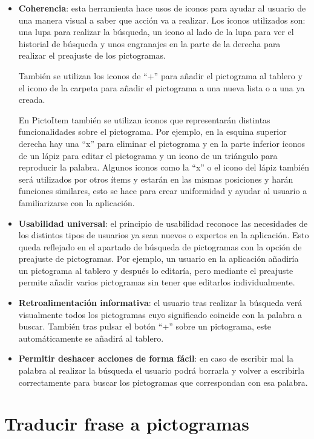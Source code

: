 \begin{itemize}
	\item \textbf{Coherencia}: esta herramienta hace usos de iconos para ayudar al usuario de una manera visual a saber que acción va a realizar. Los iconos utilizados son: una lupa para realizar la búsqueda, un icono al lado de la lupa para ver el historial de búsqueda y unos engranajes en la parte de la derecha para realizar el preajuste de los pictogramas.
	
	También se utilizan los iconos de “+” para añadir el pictograma al tablero y el icono de la carpeta para añadir el pictograma a una nueva lista o a una ya creada.
	
	En PictoItem también se utilizan iconos que representarán distintas funcionalidades sobre el pictograma. Por ejemplo, en la esquina superior derecha hay una “x” para eliminar el pictograma y en la parte inferior iconos de un lápiz para editar el pictograma y un icono de un triángulo para reproducir la palabra. Algunos iconos como la “x” o el icono del lápiz también será utilizados por otros ítems y estarán en las mismas posiciones y harán funciones similares, esto se hace para crear uniformidad y ayudar al usuario a familiarizarse con la aplicación.
	
	
	\item \textbf{Usabilidad universal}: el principio de usabilidad reconoce las necesidades de los distintos tipos de usuarios ya sean nuevos o expertos en la aplicación. Esto queda reflejado en el apartado de búsqueda de pictogramas con la opción de preajuste de pictogramas. Por ejemplo, un usuario en la aplicación añadiría un pictograma al tablero y después lo editaría, pero mediante el preajuste permite añadir varios pictogramas sin tener que editarlos individualmente.
	
	\item \textbf{Retroalimentación informativa}: el usuario tras realizar la búsqueda verá visualmente todos los pictogramas cuyo significado coincide con la palabra a buscar. También tras pulsar el botón “+” sobre un pictograma, este automáticamente se añadirá al tablero.
	
	
	\item \textbf{Permitir deshacer acciones de forma fácil}: en caso de escribir mal la palabra al realizar la búsqueda el usuario podrá borrarla y volver a escribirla correctamente para buscar los pictogramas que correspondan con esa palabra.
\end{itemize}


\section{Traducir frase a pictogramas}

